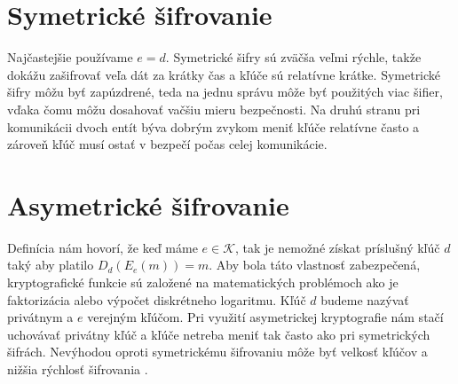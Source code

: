 		
\section{Symetrické šifrovanie}
	\newtheorem{Symetricke sifrovanie} {Nech šifrovacia schéma pozostáva z množín $\{E_e : e \in K\}$ a $\{D_d: d \in K\}$ kde $\mathcal K$ je množina všetkých kľúčov. Takúto schému nazveme symetrickou ak pre každý pár $(e,d)$ platí, že je "ľahké", vypočítať $d$ pomocou $e$, a opačne.} Najčastejšie používame $e = d$. Symetrické šifry sú zväčša veľmi rýchle, takže dokážu zašifrovať veľa dát za krátky čas a kľúče sú relatívne krátke. Symetrické šifry môžu byť zapúzdrené, teda na jednu správu môže byť použitých viac šifier, vďaka čomu môžu dosahovať vačšiu mieru bezpečnosti. Na druhú stranu pri komunikácii dvoch entít býva dobrým zvykom meniť kľúče relatívne často a zároveň kľúč musí ostať v bezpečí počas celej komunikácie.

\section{Asymetrické šifrovanie}
	\newtheorem{Asymetricke sifrovanie} {Nech $\{E_e : e \in K\}$ je množina šifrovacích funkcií a nech  $\{D_d : d \in K\}$ je množina príslušných dešifrovacích funkcií a $\mathcal K$ je množina všetkých kľúčov. Nech pre každý pár $(E_e,D_d)$ platí, že je výpočtovo "nemožné" získať správu $m \in\mathcal M$ pomocou $c \in\	 C$ a $E_e$, keď platí $E_e(m) = c$. }
	Definícia nám hovorí, že keď máme $e \in\mathcal K$, tak je nemožné získat príslušný kľúč $d$ taký aby platilo $D_d(E_e(m)) = m$. Aby bola táto vlastnosť zabezpečená,  kryptografické funkcie sú založené na matematických problémoch ako je faktorizácia alebo výpočet diskrétneho logaritmu. Kľúč $d$ budeme nazývať privátnym a $e$ verejným kľúčom. Pri využití asymetrickej kryptografie nám stačí uchovávať privátny kľúč a kľúče netreba meniť tak často ako pri symetrických šifrách. Nevýhodou oproti symetrickému šifrovaniu môže byť velkosť kľúčov a nižšia rýchlosť šifrovania	.
		
	
